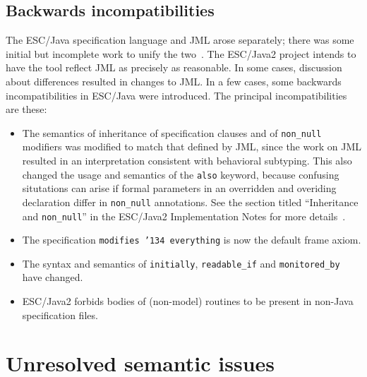 \documentclass{llncs}
\begin{document}
\subsection{Backwards incompatibilities}
The ESC/Java specification language and JML arose separately; there
was some initial but incomplete work to unify the
two~\cite{Leavens-etal03}.  The ESC/Java2 project intends to have the
tool reflect JML as precisely as reasonable.  In some cases,
discussion about differences resulted in changes to JML.  In a few
cases, some backwards incompatibilities in ESC/Java were introduced.
The principal incompatibilities are these:
\setlength{\partopsep}{0in}\setlength{\parskip}{0in}\setlength{\itemsep}{0in}\setlength{\topsep}{0in}
\begin{itemize}
\setlength{\partopsep}{0in}\setlength{\parskip}{0in}\setlength{\itemsep}{0in}\setlength{\topsep}{0in}
\item The semantics of inheritance of specification clauses and of
  \texttt{non\_null} modifiers was modified to match that defined by
  JML, since the work on JML resulted in an interpretation consistent
  with behavioral subtyping.  This also changed the usage and
  semantics of the \texttt{also} keyword, because confusing
  situtations can arise if formal parameters in an overridden and
  overiding declaration differ in \texttt{non\_null} annotations.  See
  the section titled ``Inheritance and \texttt{non\_null}'' in the
  ESC/Java2 Implementation Notes for more
  details~\cite{Cok04-Impl-Notes}.
\item The specification \texttt{modifies \char'134 everything} is now
  the default frame axiom.
\item The syntax and semantics of \texttt{initially},
  \texttt{readable\_if} and \texttt{monitored\_by} have changed.
\item ESC/Java2 forbids bodies of (non-model) routines to be present
  in non-Java specification files.
\end{itemize}

\section{Unresolved semantic issues}
\end{document}
